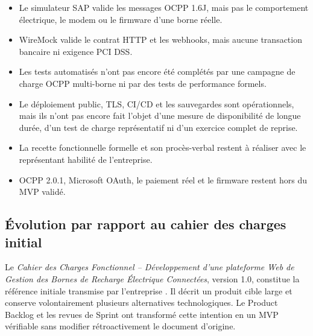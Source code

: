 \begin{scopebox}
\begin{itemize}[leftmargin=7mm]
  \item Le simulateur SAP valide les messages OCPP 1.6J, mais pas le comportement
  électrique, le modem ou le firmware d'une borne réelle.
  \item WireMock valide le contrat HTTP et les webhooks, mais aucune transaction
  bancaire ni exigence PCI DSS.
  \item Les tests automatisés n'ont pas encore été complétés par une campagne de
  charge OCPP multi-borne ni par des tests de performance formels.
  \item Le déploiement public, TLS, CI/CD et les sauvegardes sont opérationnels,
  mais ils n'ont pas encore fait l'objet d'une mesure de disponibilité de longue
  durée, d'un test de charge représentatif ni d'un exercice complet de reprise.
  \item La recette fonctionnelle formelle et son procès-verbal restent à réaliser
  avec le représentant habilité de l'entreprise.
  \item OCPP 2.0.1, Microsoft OAuth, le paiement réel et le firmware restent hors
  du MVP validé.
\end{itemize}
\end{scopebox}

\subsection{Évolution par rapport au cahier des charges initial}
\label{subsec:scope-evolution}

Le \emph{Cahier des Charges Fonctionnel -- Développement d'une plateforme Web
de Gestion des Bornes de Recharge Électrique Connectées}, version 1.0, constitue
la référence initiale transmise par l'entreprise \cite{tacticCahierCharges2026}.
Il décrit un produit cible large et conserve volontairement plusieurs
alternatives technologiques. Le Product Backlog et les revues de Sprint ont
transformé cette intention en un MVP vérifiable sans modifier rétroactivement
le document d'origine.

